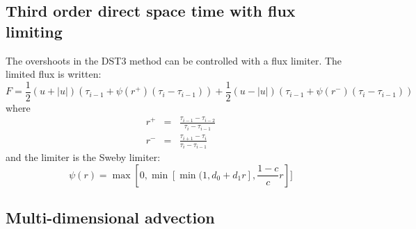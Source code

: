 \subsection{Third order direct space time with flux limiting}

The overshoots in the DST3 method can be controlled with a flux limiter.
The limited flux is written:
\begin{equation}
F =
\frac{1}{2}(u+|u|)\left( \tau_{i-1} + \psi(r^+)(\tau_{i} - \tau_{i-1} )\right)
+
\frac{1}{2}(u-|u|)\left( \tau_{i-1} + \psi(r^-)(\tau_{i} - \tau_{i-1} )\right)
\end{equation}
where
\begin{eqnarray}
r^+ & = & \frac{\tau_{i-1} - \tau_{i-2}}{\tau_{i} - \tau_{i-1}} \\
r^- & = & \frac{\tau_{i+1} - \tau_{i}}{\tau_{i} - \tau_{i-1}}
\end{eqnarray}
and the limiter is the Sweby limiter:
\begin{equation}
\psi(r) = \max[0, \min[\min(1,d_0+d_1r],\frac{1-c}{c}r ]]
\end{equation}



\subsection{Multi-dimensional advection}

